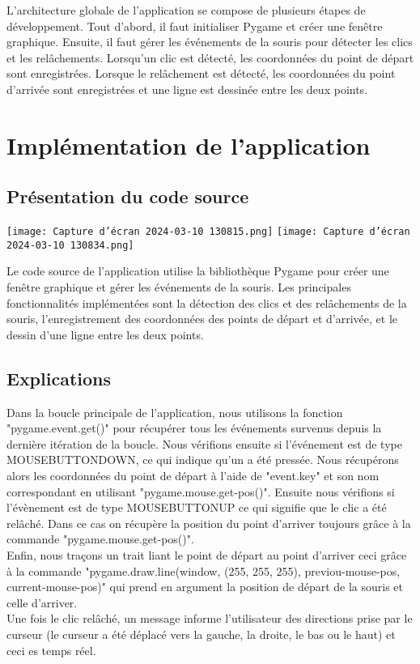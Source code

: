 \documentclass[a4paper, 12px]{article}
\begin{document}
\par L'architecture globale de l'application se compose de plusieurs étapes de développement. Tout d'abord, il faut initialiser Pygame et créer une fenêtre graphique. Ensuite, il faut gérer les événements de la souris pour détecter les clics et les relâchements. Lorsqu'un clic est détecté, les coordonnées du point de départ sont enregistrées. Lorsque le relâchement est détecté, les coordonnées du point d'arrivée sont enregistrées et une ligne est dessinée entre les deux points. 

\section{Implémentation de l'application}


\subsection{Présentation du code source}
\begin{center}
\texttt{[image: Capture d'écran 2024-03-10 130815.png]}
\texttt{[image: Capture d'écran 2024-03-10 130834.png]}
\end{center}

Le code source de l'application utilise la bibliothèque Pygame pour créer une fenêtre graphique et gérer les événements de la souris. Les principales fonctionnalités implémentées sont la détection des clics et des relâchements de la souris, l'enregistrement des coordonnées des points de départ et d'arrivée, et le dessin d'une ligne entre les deux points. 

\subsection{Explications}
Dans la boucle principale de l'application, nous utilisons la fonction "pygame.event.get()" pour récupérer tous les événements survenus depuis la dernière itération de la boucle. Nous vérifions ensuite si l'événement est de type MOUSEBUTTONDOWN, ce qui indique qu'un a été pressée. Nous récupérons alors les coordonnées du point de départ à l'aide de "event.key" et son nom correspondant en utilisant "pygame.mouse.get-pos()". Ensuite nous vérifions si l’évènement est de type MOUSEBUTTONUP ce qui signifie que le clic a été relâché. Dans ce cas on récupère la position du point d’arriver toujours grâce à la commande "pygame.mouse.get-pos()". \\
Enfin, nous traçons un trait liant le point de départ au point d’arriver ceci grâce à la commande "pygame.draw.line(window, (255, 255, 255), previou-mouse-pos, current-mouse-pos)" qui prend en argument la position de départ de la souris et celle d’arriver. \\
Une fois le clic relâché, un message informe l’utilisateur des directions prise par le curseur (le curseur a été déplacé vers la gauche, la droite, le bas ou le haut) et ceci es temps réel.
\end{document}

